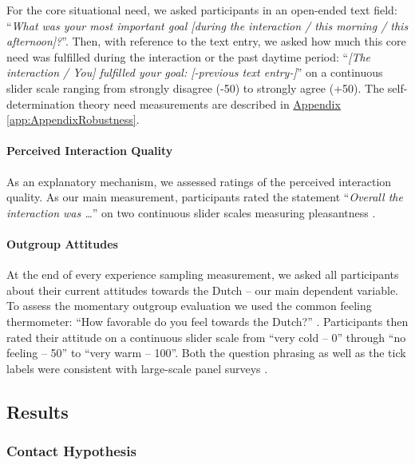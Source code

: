 \documentclass[man, 12pt, a4paper, mask]{apa7}
\theoremstyle{break}
\theoremstyle{plain}
\newcommand{\appref}[2][]{\hyperref[#2]{Appendix \ref*{#2}#1}}
\begin{document}
For the core situational need, we asked participants in an open-ended
text field:
``\textit{What was your most important goal [during the interaction / this morning / this afternoon]?}''.
Then, with reference to the text entry, we asked how much this core need
was fulfilled during the interaction or the past daytime period:
``\textit{[The interaction / You] fulfilled your goal: [-previous text entry-]}''
on a continuous slider scale ranging from strongly disagree (-50) to
strongly agree (+50). The self-determination theory need measurements
are described in \appref{app:AppendixRobustness}.

\paragraph{Perceived Interaction Quality}

As an explanatory mechanism, we assessed ratings of the perceived
interaction quality. As our main measurement, participants rated the
statement ``\textit{Overall the interaction was …}'' on two continuous
slider scales measuring pleasantness
\citep[from unpleasant (-50) to pleasant (+50)) and meaningfulness (from superficial (-50) to meaningful (+50); both items adapted from][]{Downie2008}.

\paragraph{Outgroup Attitudes}

At the end of every experience sampling measurement, we asked all
participants about their current attitudes towards the Dutch -- our main
dependent variable. To assess the momentary outgroup evaluation we used
the common feeling thermometer: ``How favorable do you feel towards the
Dutch?'' \citep[][]{Lavrakas2008}. Participants then rated their
attitude on a continuous slider scale from ``very cold -- 0'' through
``no feeling -- 50'' to ``very warm -- 100''. Both the question phrasing
as well as the tick labels were consistent with large-scale panel
surveys \citep[e.g.,][]{DeBell2010}.

\subsection{Results}

\subsubsection{Contact Hypothesis}
\end{document}

